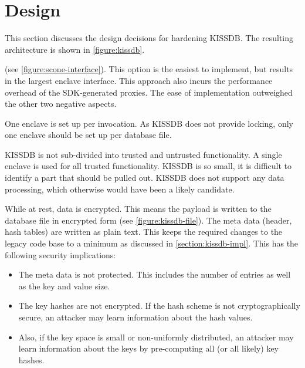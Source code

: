 \section{Design\label{ID_579142082}}
This section discusses the design decisions for hardening KISSDB. The resulting architecture is shown in \autoref{figure:kissdb}.\label{ID_1073733437}
\begin{description}\label{ID_1141938675}
\item[Shim C library]\label{ID_1861623533}
(see \autoref{figure:scone-interface}). This option is the easiest to implement, but results in the largest enclave interface.\label{ID_1093940302}
This approach also incurs the performance overhead of the SDK-generated proxies.\label{ID_1630572405}
The ease of implementation outweighed the other two negative aspects.\label{ID_199725432}
\item[Separate enclaves by data set.]\label{ID_935111514}
One enclave is set up per  invocation. As KISSDB does not provide locking, only one enclave should be set up per database file.\label{ID_145677730}
\item[Entire legacy code in enclave.]\label{ID_1029928087}
KISSDB is not sub-divided into trusted and untrusted functionality. A single enclave is used for all trusted functionality. KISSDB is so small, it is difficult to identify a part that should be pulled out. KISSDB does not support any data processing, which otherwise would have been a likely candidate.\label{ID_1638365159}
\item[Plain text meta data.]\label{ID_267118033}
While at rest, data is encrypted. This means the payload is written to the database file in encrypted form (see \autoref{figure:kissdb-file}).\label{ID_917138080}
The meta data (header, hash tables) are written as plain text.\label{ID_116310300}
This keeps the required changes to the legacy code base to a minimum as discussed in \autoref{section:kissdb-impl}.\label{ID_1173318118}
This has the following security implications:\label{ID_73618570}
\begin{itemize}\label{ID_1428140403}
\item The meta data is not protected. This includes the number of entries as well as the key and value size.\label{ID_1855200367}
\item The key hashes are not encrypted. If the hash scheme is not cryptographically secure, an attacker may learn information about the hash values.\label{ID_469155561}
\item Also, if the key space is small or non-uniformly distributed, an attacker may learn information about the keys by pre-computing all (or all likely) key hashes.\label{ID_1857228709}

\end{itemize}
\end{description}
